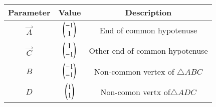 
\begin{tabular}[]{|c|c|c|}
\hline
Parameter	& Value	& Description \\ \hline
$\vec{A}$	& $\begin{pmatrix}-1\\1\end{pmatrix}$ & End of common hypotenuse \\ \hline
$\vec{C}$	& $\begin{pmatrix}1\\-1\end{pmatrix}$ & Other end of common hypotenuse\\ \hline
$B$		& $\begin{pmatrix}-1\\-1\end{pmatrix}$ & Non-common vertex of $\triangle ABC$ \\ \hline
$D$ 		& $\begin{pmatrix}1\\1\end{pmatrix}$ & Non-comon vertx of$\triangle ADC$\\ \hline
\end{tabular}

